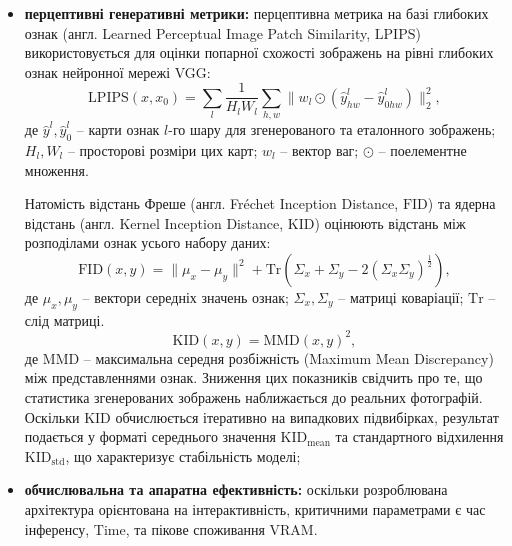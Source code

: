 \begin{itemize}[label=$\bullet$]
                Хоча ці метрики зручні для математичного аналізу, у задачах колоризації їхня репрезентативність є обмеженою:
                якщо модель згенерує семантично правильну червону машину замість оригінальної синьої,
                вони зафіксують значну помилку, незважаючи на високу візуальну правдоподібність результату;

            \item \textbf{перцептивні генеративні метрики:}
                перцептивна метрика на базі глибоких ознак (англ. Learned Perceptual Image Patch Similarity, $\mathrm{LPIPS}$) \cite{2018-zhang-unreasonable-effectiveness} використовується для оцінки попарної схожості зображень на рівні глибоких ознак нейронної мережі VGG:
                \begin{equation*}
                    \mathrm{LPIPS}(x, x_0) = \sum_l \frac{1}{H_l W_l} \sum_{h,w} \| w_l \odot (\hat{y}^l_{hw} - \hat{y}^l_{0hw}) \|_2^2,
                \end{equation*}
                де $\hat{y}^l, \hat{y}^l_0$ -- карти ознак $l$-го шару для згенерованого та еталонного зображень; $H_l, W_l$ -- просторові розміри цих карт; $w_l$ -- вектор ваг; $\odot$ -- поелементне множення.
                
                Натомість відстань Фреше (англ. Fréchet Inception Distance, $\mathrm{FID}$) \cite{2017-heusel-gans-trained} та ядерна відстань (англ. Kernel Inception Distance, $\mathrm{KID}$) \cite{2018-binkowski-demystifying-mmd} оцінюють відстань між розподілами ознак усього набору даних:
                \begin{equation*}
                    \mathrm{FID}(x, y) = \|\mu_x - \mu_y\|^2 + \mathrm{Tr}\left(\Sigma_x + \Sigma_y - 2(\Sigma_x \Sigma_y)^{\frac{1}{2}}\right),
                \end{equation*}
                де $\mu_x, \mu_y$ -- вектори середніх значень ознак; $\Sigma_x, \Sigma_y$ -- матриці коваріації; $\mathrm{Tr}$ -- слід матриці.
                \begin{equation*}
                    \mathrm{KID}(x, y) = {\mathrm{MMD}(x, y)}^2,
                \end{equation*}
                де $\mathrm{MMD}$ -- максимальна середня розбіжність (Maximum Mean Discrepancy) між представленнями ознак.
                Зниження цих показників свідчить про те, що статистика згенерованих зображень наближається до реальних фотографій.
                Оскільки $\mathrm{KID}$ обчислюється ітеративно на випадкових підвибірках,
                результат подається у форматі середнього значення $\mathrm{KID}_{\mathrm{mean}}$ та стандартного відхилення $\mathrm{KID}_{\mathrm{std}}$,
                що характеризує стабільність моделі;

            \item \textbf{обчислювальна та апаратна ефективність:}
                оскільки розроблювана архітектура орієнтована на інтерактивність,
                критичними параметрами є час інференсу, $\mathrm{Time}$, та пікове споживання $\mathrm{VRAM}$.
        \end{itemize}

